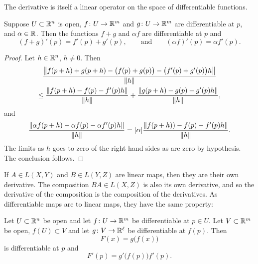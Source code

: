 The derivative is itself a linear operator on the space of differentiable
functions.

\begin{prop}
Suppose $U \subset {\mathbb{R}}^n$ is open,
$f \colon U \to {\mathbb{R}}^m$ and
$g \colon U \to {\mathbb{R}}^m$ are differentiable at $p$,
and $\alpha \in {\mathbb{R}}$.  Then the functions $f+g$ and $\alpha f$
are differentiable at $p$ and
\begin{equation*}
(f+g)'(p) = f'(p) + g'(p) , \qquad \text{and} \qquad (\alpha f)'(p) = \alpha
f'(p) .
\end{equation*}
\end{prop}

\begin{proof}
Let $h \in {\mathbb{R}}^n$, $h \not= 0$.  Then
\begin{multline*}
\frac{\left\lVert {f(p+h)+g(p+h)-\bigl(f(p)+g(p)\bigr) - \bigl(f'(p) + g'(p)\bigr)h} \right\rVert}{\lVert {h} \rVert}
\\
\leq
\frac{\left\lVert {f(p+h)-f(p) - f'(p)h} \right\rVert}{\lVert {h} \rVert}
+
\frac{\left\lVert {g(p+h)-g(p) - g'(p)h} \right\rVert}{\lVert {h} \rVert} ,
\end{multline*}
and
\begin{equation*}
\frac{\left\lVert {\alpha f(p+h) - \alpha f(p) - \alpha f'(p)h} \right\rVert}{\lVert {h} \rVert}
=
\lvert {\alpha} \rvert \frac{\left\lVert {f(p+h))-f(p) - f'(p)h} \right\rVert}{\lVert {h} \rVert} .
\end{equation*}
The limits as $h$ goes to zero of the right hand sides as are zero by
hypothesis.  The conclusion follows.
\end{proof}

If $A \in L(X,Y)$ and $B \in L(Y,Z)$ are linear maps, then 
they are their own derivative.  The composition
$BA \in L(X,Z)$ is also its own derivative, and
so the derivative of the composition is the composition
of the derivatives.  As differentiable maps are
to linear maps, they have the same property:

\begin{thm} 
Let $U \subset {\mathbb{R}}^n$ be open and let $f \colon U \to {\mathbb{R}}^m$ be
differentiable at $p \in U$.  Let $V \subset {\mathbb{R}}^m$ be open,
$f(U) \subset V$ and let $g \colon V \to {\mathbb{R}}^\ell$ be differentiable
at $f(p)$.  Then
\begin{equation*}
F(x) = g\bigl(f(x)\bigr)
\end{equation*}
is differentiable at $p$ and
\begin{equation*}
F'(p) = g'\bigl(f(p)\bigr) f'(p) .
\end{equation*}
\end{thm}

